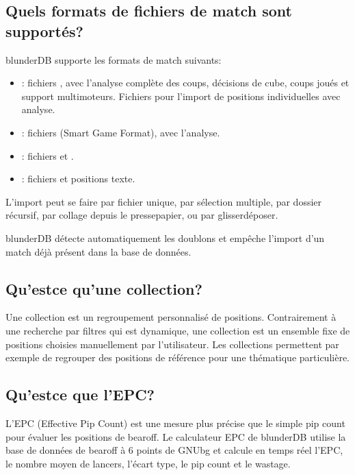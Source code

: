 \documentclass[letterpaper,10pt,french]{sphinxmanual}
\begin{document}
\subsection{Quels formats de fichiers de match sont supportés?}
\label{\detokenize{faq:quels-formats-de-fichiers-de-match-sont-supportes}}
\sphinxAtStartPar
blunderDB supporte les formats de match suivants:
\begin{itemize}
\item {} 
\sphinxAtStartPar
{}: fichiers , avec l’analyse complète des coups,
décisions de cube, coups joués et support multi\sphinxhyphen{}moteurs. Fichiers 
pour l’import de positions individuelles avec analyse.

\item {} 
\sphinxAtStartPar
{}: fichiers  (Smart Game Format), avec l’analyse.

\item {} 
\sphinxAtStartPar
{}: fichiers  et .

\item {} 
\sphinxAtStartPar
{}: fichiers  et positions texte.

\end{itemize}

\sphinxAtStartPar
L’import peut se faire par fichier unique, par sélection multiple, par dossier
récursif, par collage depuis le presse\sphinxhyphen{}papier, ou par glisser\sphinxhyphen{}déposer.

\sphinxAtStartPar
blunderDB détecte automatiquement les doublons et empêche l’import d’un match
déjà présent dans la base de données.


\subsection{Qu’est\sphinxhyphen{}ce qu’une collection?}
\label{\detokenize{faq:qu-est-ce-qu-une-collection}}
\sphinxAtStartPar
Une collection est un regroupement personnalisé de positions. Contrairement
à une recherche par filtres qui est dynamique, une collection est un ensemble
fixe de positions choisies manuellement par l’utilisateur. Les collections
permettent par exemple de regrouper des positions de référence pour une
thématique particulière.


\subsection{Qu’est\sphinxhyphen{}ce que l’EPC?}
\label{\detokenize{faq:qu-est-ce-que-l-epc}}
\sphinxAtStartPar
L’EPC (Effective Pip Count) est une mesure plus précise que le simple pip count
pour évaluer les positions de bearoff. Le calculateur EPC de blunderDB utilise
la base de données de bearoff à 6 points de GNUbg et calcule en temps réel
l’EPC, le nombre moyen de lancers, l’écart type, le pip count et le wastage.
\end{document}
